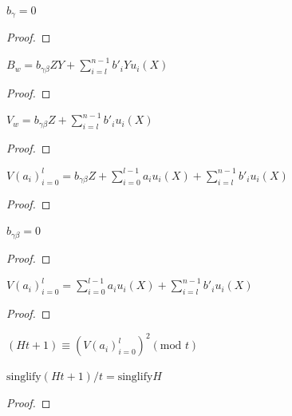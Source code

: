 \begin{lemma}\label{lem:b_g_zero}
$b_{\gamma} = 0$
\end{lemma}
\begin{proof}
\leanok
\end{proof}

\begin{lemma}\label{lem:B_def}
\leanok
$B_w = b_{\gamma \beta} ZY + \sum_{i = l}^{n - 1} b'_i Y u_i(X) $
\end{lemma}
\begin{proof}
\leanok
{}
\end{proof}

\begin{lemma} \label{lem:V_def}
\leanok
$V_w = b_{\gamma \beta} Z + \sum_{i = l}^{n - 1} b'_i u_i(X) $
\end{lemma}
\begin{proof}
\leanok
{}
\end{proof}

\begin{lemma} \label{lem:V_eval}
\leanok
$V (a_i)_{i = 0}^{l} = b_{\gamma \beta} Z + \sum_{i = 0}^{l - 1} a_i u_i(X) + \sum_{i = l}^{n - 1} b'_i u_i(X) $
\end{lemma}
\begin{proof}
\leanok
\end{proof}

\begin{lemma} \label{lem:b_gb_zero}
\leanok
$b_{\gamma \beta} = 0$
\end{lemma}
\begin{proof}
\leanok
{}
\end{proof}

\begin{lemma} \label{lem:V_eval2}
\leanok
$V (a_i)_{i = 0}^{l} = \sum_{i = 0}^{l - 1} a_i u_i(X) + \sum_{i = l}^{n - 1} b'_i u_i(X) $
\end{lemma}
\begin{proof}
\leanok
{}
\end{proof}

\begin{lemma} \label{lem:Ht_mod_t}
\leanok
{}
$ (Ht + 1) \equiv (V (a_i)_{i = 0}^{l})^2 (\text{mod }t) $
\end{lemma}

\begin{lemma} \label{lem:singlify_Ht}
$\textrm{singlify} (Ht + 1)/t = \textrm{singlify} H$
\end{lemma}
\begin{proof}
\end{proof}

